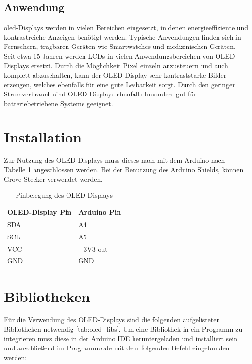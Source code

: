 \subsection{Anwendung}
\ac{oled}-Displays werden in vielen Bereichen eingesetzt, in denen energieeffiziente und kontrastreiche Anzeigen benötigt werden. Typische Anwendungen finden sich in Fernsehern, tragbaren Geräten wie Smartwatches und medizinischen Geräten.
Seit etwa 15 Jahren werden LCDs in vielen Anwendungsbereichen von OLED-Displays ersetzt. Durch die Möglichkeit Pixel einzeln anzusteuern und auch komplett abzuschalten, kann der OLED-Display sehr kontraststarke Bilder erzeugen, welches ebenfalls für eine gute Lesbarkeit sorgt.
Durch den geringen Stromverbrauch sind OLED-Displays ebenfalls besonders gut für batteriebetriebene Systeme geeignet.\cite{Schreiter.2019}


\section{Installation}
Zur Nutzung des OLED-Displays muss dieses nach mit dem Arduino nach Tabelle \ref{tab:oled_pinbelegung} angeschlossen werden. Bei der Benutzung des Arduino Shields, können Grove-Stecker verwendet werden. 
\begin{longtable}[h]{|p{5cm}|p{8cm}|}
	\caption{Pinbelegung des OLED-Displays}
	\label{tab:oled_pinbelegung} \\
	\hline
	\textbf{OLED-Display Pin} & \textbf{Arduino Pin} \\ \hline
	SDA & A4 \\ \hline
	SCL & A5 \\ \hline
	VCC & {+}3V3 out \\ \hline
	GND & GND \\ \hline
\end{longtable}




\section{Bibliotheken}
Für die Verwendung des OLED-Displays sind die folgenden aufgelisteten Bibliotheken notwendig \ref{tab:oled_libs}. Um eine Bibliothek in ein Programm zu integrieren muss diese in der Arduino IDE heruntergeladen und installiert sein und anschließend im Programmcode mit dem folgenden Befehl eingebunden werden:  \newline

 
